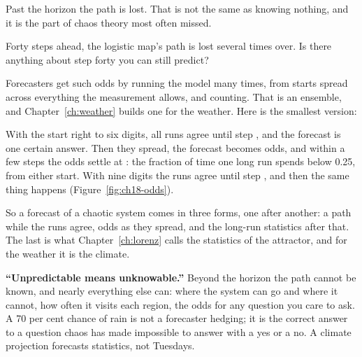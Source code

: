 \noindent
Past the horizon the path is lost. That is not the same as knowing nothing,
and it is the part of chaos theory most often missed.

\begin{think}
Forty steps ahead, the logistic map's path is lost several times over. Is
there anything about step forty you can still predict?
\end{think}
Forecasters get such odds by running the model many times, from starts
spread across everything the measurement allows, and counting. That is an
ensemble, and Chapter~\ref{ch:weather} builds one for the weather. Here is
the smallest version:



\noindent
With the start right to six digits, all  runs agree
until step , and the forecast is one certain answer.
Then they spread, the forecast becomes odds, and within a few steps the
odds settle at : the fraction of time one long run spends
below \num{0.25}, from either start. With nine digits the runs agree until
step , and then the same thing happens
(Figure~\ref{fig:ch18-odds}).


So a forecast of a chaotic system comes in three forms, one after another:
a path while the runs agree, odds as they spread, and the long-run
statistics after that. The last is what Chapter~\ref{ch:lorenz} calls the
statistics of the attractor, and for the weather it is the climate.

\begin{trapbox}
\textbf{\enquote{Unpredictable means unknowable.}} Beyond the horizon the
path cannot be known, and nearly everything else can: where the system can
go and where it cannot, how often it visits each region, the odds for any
question you care to ask. A 70 per cent chance of rain is not a forecaster
hedging; it is the correct answer to a question chaos has made impossible to
answer with a yes or a no. A climate projection forecasts statistics, not
Tuesdays.
\end{trapbox}

